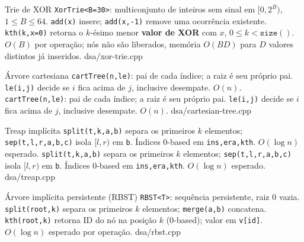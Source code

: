 \ifextended

\templateentry
{Trie de XOR}
{}
{\texttt{XorTrie<B=30>}: multiconjunto de inteiros sem sinal em $[0,2^B)$, $1\le B\le64$. \texttt{add(x)} insere; \texttt{add(x,-1)} remove uma ocorrência existente. \texttt{kth(k,x=0)} retorna o $k$-ésimo menor \textbf{valor de XOR} com $x$, $0\le k<\mathtt{size()}$. $O(B)$ por operação; nós não são liberados, memória $O(BD)$ para $D$ valores distintos já inseridos.}
{dsa/xor-trie.cpp}

\fi

\templateentry
{Árvore cartesiana}
{\texttt{cartTree(n,le)}: pai de cada índice; a raiz é seu próprio pai. \texttt{le(i,j)} decide se $i$ fica acima de $j$, inclusive desempate. $O(n)$.}
{\texttt{cartTree(n,le)}: pai de cada índice; a raiz é seu próprio pai. \texttt{le(i,j)} decide se $i$ fica acima de $j$, inclusive desempate. $O(n)$.}
{dsa/cartesian-tree.cpp}

\templateentry
{Treap implícita}
{\texttt{split(t,k,a,b)} separa os primeiros $k$ elementos; \texttt{sep(t,l,r,a,b,c)} isola $[l,r)$ em \texttt{b}. Índices 0-based em \texttt{ins,era,kth}. $O(\log n)$ esperado.}
{\texttt{split(t,k,a,b)} separa os primeiros $k$ elementos; \texttt{sep(t,l,r,a,b,c)} isola $[l,r)$ em \texttt{b}. Índices 0-based em \texttt{ins,era,kth}. $O(\log n)$ esperado.}
{dsa/treap.cpp}

\ifextended

\templateentry
{Árvore implícita persistente (RBST)}
{}
{\texttt{RBST<T>}: sequência persistente, raiz 0 vazia. \texttt{split(root,k)} separa os primeiros $k$ elementos; \texttt{merge(a,b)} concatena. \texttt{kth(root,k)} retorna ID do nó na posição $k$ (0-based); valor em \texttt{v[id]}. $O(\log n)$ esperado por operação.}
{dsa/rbst.cpp}

\fi

